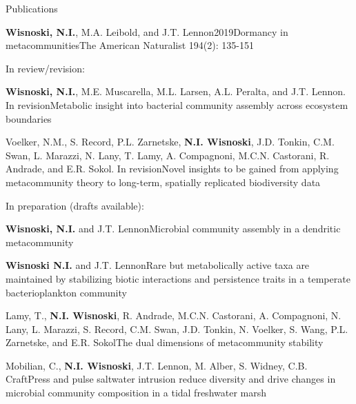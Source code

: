 \documentclass{resume} %
\begin{document}
\begin{rhangSection}{Publications}
\begin{Publication}{{\bf Wisnoski, N.I.}, M.A. Leibold, and J.T. Lennon}{2019}{Dormancy in metacommunities}{The American Naturalist 194(2): 135-151}
\end{Publication}

\bigskip
{ In review/revision:}

\begin{Prep}{{\bf Wisnoski, N.I.}, M.E. Muscarella, M.L. Larsen, A.L. Peralta, and J.T. Lennon. In revision}{Metabolic insight into bacterial community assembly across ecosystem boundaries}
\end{Prep}

\begin{Prep}{Voelker, N.M., S. Record, P.L. Zarnetske, {\bf N.I. Wisnoski}, J.D. Tonkin, C.M. Swan, L. Marazzi, N. Lany, T. Lamy, A. Compagnoni, M.C.N. Castorani, R. Andrade, and E.R. Sokol. In revision}{Novel insights to be gained from applying metacommunity theory to long-term, spatially replicated biodiversity data}
\end{Prep}

\bigskip
{ In preparation (drafts available):}

\begin{Prep}{{\bf Wisnoski, N.I.} and J.T. Lennon}{Microbial community assembly in a dendritic metacommunity}
\end{Prep}

\begin{Prep}{{\bf Wisnoski N.I.} and J.T. Lennon}{Rare but metabolically active taxa are maintained by stabilizing biotic interactions and persistence traits in a temperate bacterioplankton community}
\end{Prep}

\begin{Prep}{Lamy, T., {\bf N.I. Wisnoski}, R. Andrade, M.C.N. Castorani, A. Compagnoni, N. Lany, L. Marazzi, S. Record, C.M. Swan, J.D. Tonkin, N. Voelker, S. Wang, P.L. Zarnetske, and E.R. Sokol}{The dual dimensions of metacommunity stability}
\end{Prep}

\begin{Prep}{Mobilian, C., {\bf N.I. Wisnoski}, J.T. Lennon, M. Alber, S. Widney, C.B. Craft}{Press and pulse saltwater intrusion reduce diversity and drive changes in microbial community composition in a tidal freshwater marsh}
\end{Prep}


\end{rhangSection}
\end{document}
